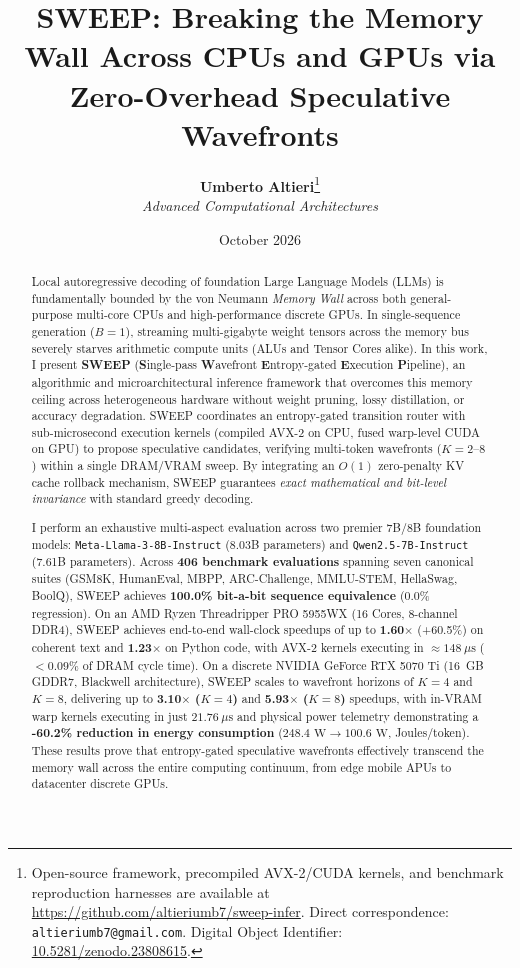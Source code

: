 \documentclass[journal,10pt,twocolumn]{article}
\title{\textbf{\Large SWEEP: Breaking the Memory Wall Across CPUs and GPUs via Zero-Overhead Speculative Wavefronts}}
\author{\textbf{Umberto Altieri}\thanks{Open-source framework, precompiled AVX-2/CUDA kernels, and benchmark reproduction harnesses are available at \url{https://github.com/altieriumb7/sweep-infer}. Direct correspondence: \texttt{altieriumb7@gmail.com}. Digital Object Identifier: \href{https://doi.org/10.5281/zenodo.23808615}{10.5281/zenodo.23808615}.}\\
\textit{Advanced Computational Architectures}}
\date{October 2026}
\theoremstyle{definition}
\begin{document}
\maketitle

\begin{abstract}
Local autoregressive decoding of foundation Large Language Models (LLMs) is fundamentally bounded by the von Neumann \textit{Memory Wall} across both general-purpose multi-core CPUs and high-performance discrete GPUs. In single-sequence generation ($B=1$), streaming multi-gigabyte weight tensors across the memory bus severely starves arithmetic compute units (ALUs and Tensor Cores alike). In this work, I present \textbf{SWEEP} (\textbf{S}ingle-pass \textbf{W}avefront \textbf{E}ntropy-gated \textbf{E}xecution \textbf{P}ipeline), an algorithmic and microarchitectural inference framework that overcomes this memory ceiling across heterogeneous hardware without weight pruning, lossy distillation, or accuracy degradation. SWEEP coordinates an entropy-gated transition router with sub-microsecond execution kernels (compiled AVX-2 on CPU, fused warp-level CUDA on GPU) to propose speculative candidates, verifying multi-token wavefronts ($K=2\text{--}8$) within a single DRAM/VRAM sweep. By integrating an $O(1)$ zero-penalty KV cache rollback mechanism, SWEEP guarantees \textit{exact mathematical and bit-level invariance} with standard greedy decoding. 

I perform an exhaustive multi-aspect evaluation across two premier 7B/8B foundation models: \texttt{Meta-Llama-3-8B-Instruct} (8.03B parameters) and \texttt{Qwen2.5-7B-Instruct} (7.61B parameters). Across \textbf{406 benchmark evaluations} spanning seven canonical suites (GSM8K, HumanEval, MBPP, ARC-Challenge, MMLU-STEM, HellaSwag, BoolQ), SWEEP achieves \textbf{100.0\% bit-a-bit sequence equivalence} (0.0\% regression). On an AMD Ryzen Threadripper PRO 5955WX (16 Cores, 8-channel DDR4), SWEEP achieves end-to-end wall-clock speedups of up to \textbf{1.60$\times$} (+60.5\%) on coherent text and \textbf{1.23$\times$} on Python code, with AVX-2 kernels executing in $\approx 148\ \mu\text{s}$ ($<0.09\%$ of DRAM cycle time). On a discrete NVIDIA GeForce RTX 5070 Ti (16~GB GDDR7, Blackwell architecture), SWEEP scales to wavefront horizons of $K=4$ and $K=8$, delivering up to \textbf{3.10$\times$ ($K=4$)} and \textbf{5.93$\times$ ($K=8$)} speedups, with in-VRAM warp kernels executing in just $21.76\ \mu\text{s}$ and physical power telemetry demonstrating a \textbf{-60.2\% reduction in energy consumption} ($248.4\text{ W} \to 100.6\text{ W}$, Joules/token). These results prove that entropy-gated speculative wavefronts effectively transcend the memory wall across the entire computing continuum, from edge mobile APUs to datacenter discrete GPUs.
\end{abstract}
\end{document}
